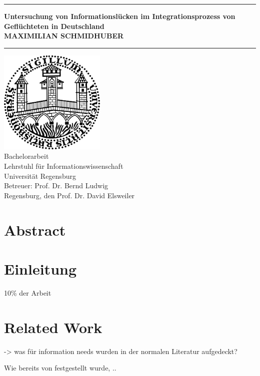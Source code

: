 \documentclass[12pt,oneside]{article}
\newcommand{\JMUTitle}[9]{

  \thispagestyle{empty}
  \vspace*{\stretch{1}}
  {\parindent0cm
  \rule{\linewidth}{.7ex}}
  \begin{flushright}
    \vspace*{\stretch{1}}
    \sffamily\bfseries\Huge
    #1\\
    \vspace*{\stretch{1}}
    \sffamily\bfseries\large
    #2
    \vspace*{\stretch{1}}
  \end{flushright}
  \rule{\linewidth}{.7ex}

  \vspace*{\stretch{1}}
  \begin{center}
    \includegraphics[width=2in]{Unisiegel.png} \\
    \vspace*{\stretch{1}}
    \Large Bachelorarbeit  \\

    \vspace*{\stretch{2}}
   \large Lehrstuhl f\"{u}r Informationswissenschaft\\
    \large Universität Regensburg\\
    \vspace*{\stretch{1}}
    \large Betreuer:  #7 \\[1mm]
    
    \vspace*{\stretch{1}}
    \large Regensburg, den #6
  \end{center}
}
\begin{document}
  \JMUTitle
      {Untersuchung von Informationslücken im Integrationsprozess von Geflüchteten in Deutschland}        %
      {MAXIMILIAN SCHMIDHUBER}                  %
      
      {Fakultät für Sprach-, Literatur- und Kulturwissenschaften}  %
      {Regensburg 2019}                          %
      {24.05.2019}                              %
      {Prof. Dr. David Elsweiler}               %
      {Prof. Dr. Bernd Ludwig}                  %
      
  \clearpage

\lhead{}
    \setcounter{page}{1}

\tableofcontents
\clearpage

\listoffigures

\listoftables
\clearpage

\section*{Abstract}

\blindtext


\cleardoublepage
{}  
    \setcounter{page}{1}
\lhead{\nouppercase{\leftmark}}


\section{Einleitung} \label{einleitung}

10\% der Arbeit



\section{Related Work}

-> was für information needs wurden in der normalen Literatur aufgedeckt?

Wie bereits von \cite{oduntan2017investigating} festgestellt wurde, ..
\end{document}
